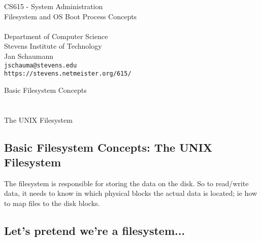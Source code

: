 \documentclass[xga]{xdvislides}
\begin{document}
\setfontphv

\lhead{\slidetitle}                               %
\cfoot{\relax}                               %
\rfoot{\Gray{\today}}

\vspace*{\fill}
\begin{center}
	\Hugesize
		CS615 - System Administration\\ [1em]
		Filesystem and OS Boot Process Concepts \\ [1em]
	\hspace*{5mm}\blueline\\ [1em]
	\Normalsize
		Department of Computer Science\\
		Stevens Institute of Technology\\
		Jan Schaumann\\
		\verb+jschauma@stevens.edu+ \\
		\verb+https://stevens.netmeister.org/615/+
\end{center}
\vspace*{\fill}

\newpage
\vspace*{\fill}
\begin{center}
	\Hugesize
		Basic Filesystem Concepts\\ [1em]
	\hspace*{5mm}
	\blueline\\
	\hspace*{5mm}\\
		The UNIX Filesystem
\end{center}
\vspace*{\fill}

\subsection{Basic Filesystem Concepts: The UNIX Filesystem}
The filesystem is responsible for storing the data on the disk.
So to read/write data, it needs to know in which physical blocks the actual
data is located; ie how to map files to the disk blocks.

\subsection{Let's pretend we're a filesystem...}
\end{document}

